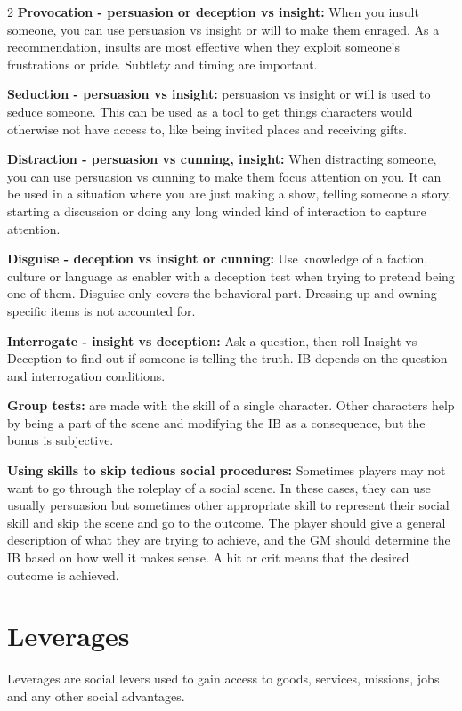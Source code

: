 \begin{multicols}{2}
\textbf{Provocation - persuasion or deception vs insight:} When you insult someone, you can use persuasion vs insight or will to make them enraged. As a recommendation, insults are most effective when they exploit someone's frustrations or pride. Subtlety and timing are important. 

\textbf{Seduction - persuasion vs insight:} persuasion vs insight or will is used to seduce someone. This can be used as a tool to get things characters would otherwise not have access to, like being invited places and receiving gifts. 

\textbf{Distraction - persuasion vs cunning, insight:} When distracting someone, you can use persuasion vs cunning to make them focus attention on you. It can be used in a situation where you are just making a show, telling someone a story, starting a discussion or doing any long winded kind of interaction to capture attention. 

\textbf{Disguise - deception vs insight or cunning:} Use knowledge of a faction, culture or language as enabler with a deception test when trying to pretend being one of them. Disguise only covers the behavioral part. Dressing up and owning specific items is not accounted for.

\textbf{Interrogate - insight vs deception:} Ask a question, then roll Insight vs Deception to find out if someone is telling the truth. IB depends on the question and interrogation conditions. 

\textbf{Group tests:} are made with the skill of a single character. Other characters help by being a part of the scene and modifying the IB as a consequence, but the bonus is subjective.

\textbf{Using skills to skip tedious social procedures:} Sometimes players may not want to go through the roleplay of a social scene. In these cases, they can use usually persuasion but sometimes other appropriate skill to represent their social skill and skip the scene and go to the outcome. The player should give a general description of what they are trying to achieve, and the GM should determine the IB based on how well it makes sense. A hit or crit means that the desired outcome is achieved.


\section{Leverages}

Leverages are social levers used to gain access to goods, services, missions, jobs and any other social advantages.



\end{multicols}
